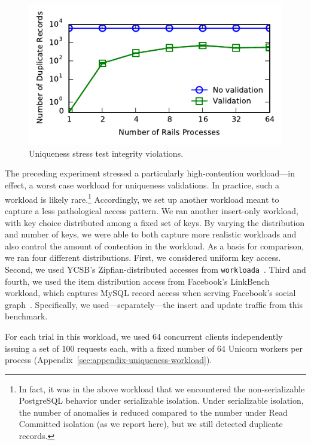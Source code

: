 \begin{figure}\vspace{-1em}
\includegraphics[width=\columnwidth]{figs/pk_stress_violations.pdf}\vspace{-1.5em}
\caption{Uniqueness stress test integrity violations.}
\label{fig:pk-stress}
\end{figure} 

 The preceding experiment stressed a
particularly high-contention workload---in effect, a worst case
workload for uniqueness validations. In practice, such a workload is
likely rare.\footnote{In fact, it was in the above workload that we
  encountered the non-serializable PostgreSQL behavior under
  serializable isolation. Under serializable isolation, the number of
  anomalies is reduced compared to the number under Read Committed
  isolation (as we report here), but we still detected duplicate
  records.} Accordingly, we set up another workload meant to capture a
less pathological access pattern. We ran another insert-only workload,
with key choice distributed among a fixed set of keys. By varying the
distribution and number of keys, we were able to both capture more
realistic workloads and also control the amount of contention in the
workload. As a basis for comparison, we ran four different
distributions. First, we considered uniform key access. Second, we
used YCSB's Zipfian-distributed accesses from
\texttt{workloada}~\cite{ycsb}. Third and fourth, we used the item
distribution access from Facebook's LinkBench workload, which captures
MySQL record access when serving Facebook's social
graph~\cite{linkbench}. Specifically, we used---separately---the
insert and update traffic from this benchmark.

For each trial in this workload, we used 64 concurrent clients
independently issuing a set of 100 requests each, with a fixed number
of 64 Unicorn workers per process (Appendix~\ref{sec:appendix-uniqueness-workload}). 

